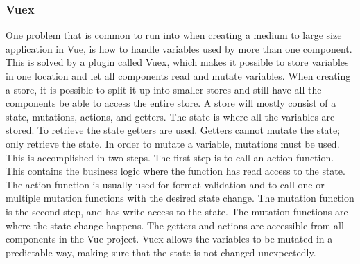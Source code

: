 \subsubsection{Vuex}
One problem that is common to run into when creating a medium to large size application in Vue, is how to handle variables used by more than one component. This is solved by a plugin called Vuex\cite{VUEX}, which makes it possible to store variables in one location and let all components read and mutate variables. When creating a store, it is possible to split it up into smaller stores and still have all the components be able to access the entire store. A store will mostly consist of a state, mutations, actions, and getters. The state is where all the variables are stored. To retrieve the state getters are used. Getters cannot mutate the state; only retrieve the state. In order to mutate a variable, mutations must be used. This is accomplished in two steps. The first step is to call an action function. This contains the business logic where the function has read access to the state. The action function is usually used for format validation and to call one or multiple mutation functions with the desired state change. The mutation function is the second step, and has write access to the state. The mutation functions are where the state change happens. The getters and actions are accessible from all components in the Vue project. Vuex allows the variables to be mutated in a predictable way, making sure that the state is not changed unexpectedly.